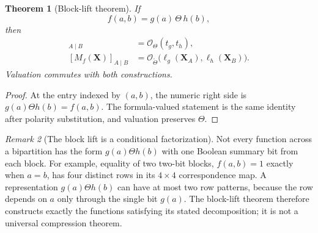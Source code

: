 \documentclass[11pt]{article}
\newtheorem{theorem}{Theorem}[section]
\theoremstyle{definition}
\theoremstyle{remark}
\newtheorem{remark}[theorem]{Remark}
\newcommand{\cO}{\mathcal O}
\begin{document}
\begin{theorem}[Block-lift theorem]
If
\[
 f(a,b)=g(a)\,\Theta\,h(b),
\]
then
\begin{align}
 [f]_{A\mid B}&=\cO_\Theta(t_g,t_h),
 \label{eq:blocklift}\\
 [M_f(\mathbf X)]_{A\mid B}&=\cO_{\widetilde\Theta}\bigl(\ell_g(\mathbf X_A),\ell_h(\mathbf X_B)\bigr).
 \label{eq:symbolicblocklift}
\end{align}
Valuation commutes with both constructions.
\end{theorem}
\begin{proof}
At the entry indexed by $(a,b)$, the numeric right side is $g(a)\Theta h(b)=f(a,b)$.  The formula-valued statement is the same identity after polarity substitution, and valuation preserves $\Theta$.
\end{proof}

\begin{remark}[The block lift is a conditional factorization]
Not every function across a bipartition has the form $g(a)\Theta h(b)$ with one Boolean summary bit from each block.  For example, equality of two two-bit blocks, $f(a,b)=1$ exactly when $a=b$, has four distinct rows in its $4\times4$ correspondence map.  A representation $g(a)\Theta h(b)$ can have at most two row patterns, because the row depends on $a$ only through the single bit $g(a)$.  The block-lift theorem therefore constructs exactly the functions satisfying its stated decomposition; it is not a universal compression theorem.
\end{remark}
\end{document}
